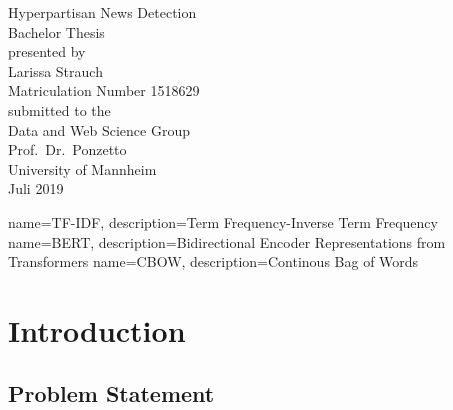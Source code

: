 \documentclass[a4paper, 11pt,titlepage,oneside,openany]{book}
\begin{document}
\begin{titlepage}
	\vspace*{2cm}
  \begin{center}
   {\Large Hyperpartisan News Detection\\}
   \vspace{2cm} 
   {Bachelor Thesis\\}
   \vspace{2cm}
   {presented by\\
    Larissa Strauch \\
    Matriculation Number 1518629\\
   }
   \vspace{1cm} 
   {submitted to the\\
    Data and Web Science Group\\
    Prof.\ Dr.\ Ponzetto\\
    University of Mannheim\\} \vspace{2cm}
   {Juli 2019}
  \end{center}
\end{titlepage} 

\tableofcontents
\newpage

\listofalgorithms

\listoffigures

\listoftables

{
	name=TF-IDF,
	description={Term Frequency-Inverse Term Frequency}
}
{
	name=BERT,
	description={Bidirectional Encoder Representations from Transformers}
}
{
	name=CBOW,
	description={Continous Bag of Words}
}


\printglossaries %


\newpage



\chapter{Introduction}

\section{Problem Statement}
 
\end{document}
